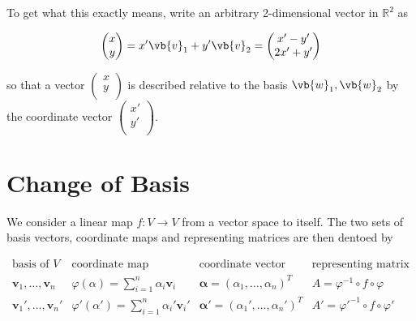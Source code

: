 \documentclass[a4paper,12pt]{report}
\begin{document}
{To get what this exactly means, write an arbitrary 2-dimensional vector in \(\mathbb{R}^{2}\)  as

\begin{equation}
    \begin{pmatrix}
         x \\
         y \\
    \end{pmatrix} = x'\vb{v} _{1}  + y'\vb{v} _{2} = \begin{pmatrix}
         x'-y' \\
         2x'+y' \\
    \end{pmatrix}  
\end{equation}

so that a vector \(\begin{pmatrix}
     x \\
     y \\
\end{pmatrix} \) is described relative to the basis \({\vb{w} _{1}, \vb{w} _{2}  }\) by the coordinate vector \(\begin{pmatrix}
     x' \\
     y' \\
\end{pmatrix}\).    } 

\section{Change of Basis}

We consider a linear map \(f:V \rightarrow V\) from a vector space to itself. The two sets of basis vectors, coordinate maps and representing matrices are then dentoed by

\begin{equation}
\begin{array}{cccc}
\text{basis of } V & \text{coordinate map} & \text{coordinate vector} & \text{representing matrix} \\[10pt]
\bm{v}_1, \ldots, \bm{v}_n & \varphi(\alpha) = \sum_{i=1}^n \alpha_i \bm{v}_i & \bm{\alpha} = (\alpha_1, \ldots, \alpha_n)^T & A = \varphi^{-1} \circ f \circ \varphi \\[15pt]
\bm{v}_1', \ldots, \bm{v}_n' & \varphi'(\alpha') = \sum_{i=1}^n \alpha_i' \bm{v}_i' & \bm{\alpha}' = (\alpha_1', \ldots, \alpha_n')^T & A' = \varphi'^{-1} \circ f \circ \varphi' \\[10pt]
\end{array}
\end{equation}
\end{document}
